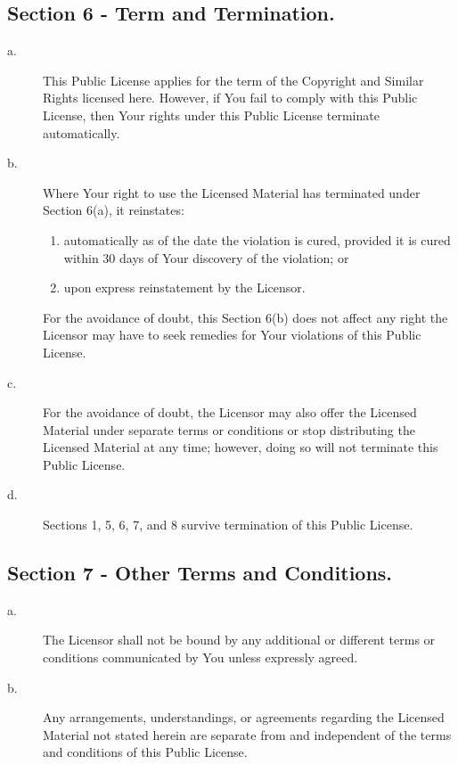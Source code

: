 \subsection{Section 6 - Term and Termination.}
\begin{description}
\item [a.] This Public License applies for the term of the Copyright and Similar Rights licensed here. However, if You fail to comply with this Public License, then Your rights under this Public License terminate automatically.
\item [b.] Where Your right to use the Licensed Material has terminated under Section 6(a), it reinstates:
\begin{enumerate}
\item automatically as of the date the violation is cured, provided it is cured within 30 days of Your discovery of the violation; or
\item upon express reinstatement by the Licensor.
\end{enumerate}
For the avoidance of doubt, this Section 6(b) does not affect any right the Licensor may have to seek remedies for Your violations of this Public License.
\item [c.] For the avoidance of doubt, the Licensor may also offer the Licensed Material under separate terms or conditions or stop distributing the Licensed Material at any time; however, doing so will not terminate this Public License.
\item [d.] Sections 1, 5, 6, 7, and 8 survive termination of this Public License.
\end{description}

\subsection{Section 7 - Other Terms and Conditions.}
\begin{description}
\item [a.] The Licensor shall not be bound by any additional or different terms or conditions communicated by You unless expressly agreed.
\item [b.] Any arrangements, understandings, or agreements regarding the Licensed Material not stated herein are separate from and independent of the terms and conditions of this Public License.
\end{description}

